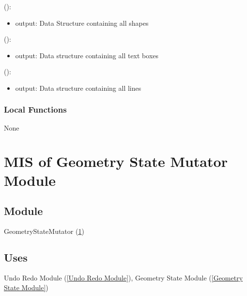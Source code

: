 \documentclass[12pt, titlepage]{article}
\begin{document}
():
\begin{itemize}
\item output: Data Structure containing all shapes
\end{itemize}

():
\begin{itemize}
\item output: Data structure containing all text boxes
\end{itemize}

():
\begin{itemize}
\item output: Data structure containing all lines
\end{itemize}

%

\subsubsection{Local Functions}
None

\newpage
\section{MIS of {Geometry State Mutator Module}} \label{Geometry State Mutator Module}
%
%

\subsection{Module}
GeometryStateMutator (\ref{Geometry State Mutator Module})


\subsection{Uses}
{Undo Redo Module} (\ref{Undo Redo Module}),
{Geometry State Module} (\ref{Geometry State Module})
\end{document}

